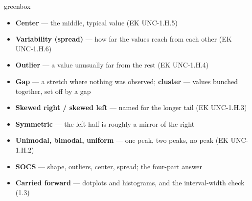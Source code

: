 \documentclass[10pt]{article}
\begin{document}
\boxguard
\begin{skillbox}{greenbox}
\begin{minipage}[t]{0.48\linewidth}
    \begin{itemize}
        \item \textbf{Center} --- the middle, typical value (EK UNC-1.H.5)
        \item \textbf{Variability (spread)} --- how far the values reach from each other
              (EK UNC-1.H.6)
        \item \textbf{Outlier} --- a value unusually far from the rest (EK UNC-1.H.4)
        \item \textbf{Gap} --- a stretch where nothing was observed; \textbf{cluster} ---
              values bunched together, set off by a gap
    \end{itemize}
\end{minipage}
\hfill
\begin{minipage}[t]{0.48\linewidth}
    \begin{itemize}
        \item \textbf{Skewed right / skewed left} --- named for the longer tail
              (EK UNC-1.H.3)
        \item \textbf{Symmetric} --- the left half is roughly a mirror of the right
        \item \textbf{Unimodal, bimodal, uniform} --- one peak, two peaks, no peak
              (EK UNC-1.H.2)
        \item \textbf{SOCS} --- shape, outliers, center, spread; the four-part answer
        \item \textbf{Carried forward} --- dotplots and histograms, and the interval-width
              check (1.3)
    \end{itemize}
\end{minipage}
\end{skillbox}
\end{document}
